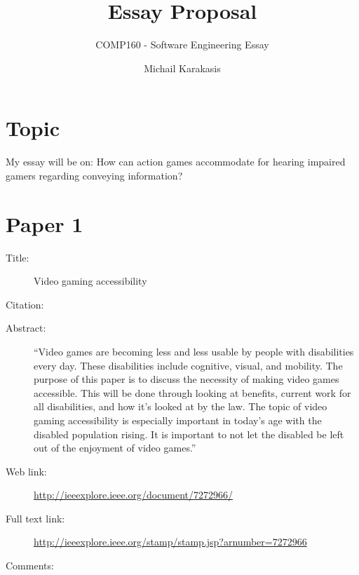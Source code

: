 \documentclass{scrartcl}
\title{Essay Proposal}
\subtitle{COMP160 - Software Engineering Essay}
\author{Michail Karakasis}
\begin{document}
\maketitle

\section*{Topic}

My essay will be on:
How can action games accommodate for hearing impaired gamers regarding conveying information?

\section*{Paper 1}
\begin{description}
\item[Title:] Video gaming accessibility
\item[Citation:] \cite{McPheron}
\item[Abstract:] ``Video games are becoming less and less usable by people with disabilities every day. These disabilities include cognitive, visual, and mobility. The purpose of this paper is to discuss the necessity of making video games accessible. This will be done through looking at benefits, current work for all disabilities, and how it's looked at by the law. The topic of video gaming accessibility is especially important in today's age with the disabled population rising. It is important to not let the disabled be left out of the enjoyment of video games.''
\item[Web link:] \url {http://ieeexplore.ieee.org/document/7272966/}
\item[Full text link:] \url {http://ieeexplore.ieee.org/stamp/stamp.jsp?arnumber=7272966}
\item[Comments:] 
\end{description}
\end{document}
